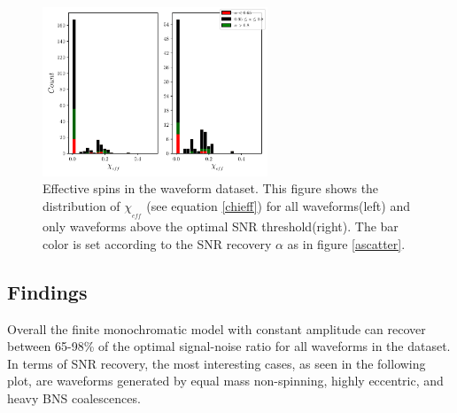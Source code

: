 \begin{figure}[hbt!]
\begin{center}
\includegraphics[width=0.6\textwidth, angle=0]{images/Data_analysis/results/alpha_chihist.pdf}
\captionsetup{width=0.8\textwidth}
\caption[Effective spins in the waveform dataset]{Effective spins in the waveform dataset. This figure shows the distribution of $\chi_{_{eff}}$ (see equation \ref{chieff}) for all waveforms(left) and only waveforms above the optimal SNR threshold(right). The bar color is set according to the SNR recovery $\alpha$ as in figure \ref{ascatter}.}
\label{achihist}
\end{center}
\end{figure}

\FloatBarrier


\subsection*{Findings}
Overall the finite monochromatic model with constant amplitude can recover between 65-98\% of the optimal signal-noise ratio for all waveforms in the dataset. In terms of SNR recovery, the most interesting cases, as seen in the following plot, are waveforms generated by equal mass non-spinning, highly eccentric, and heavy BNS coalescences. 

